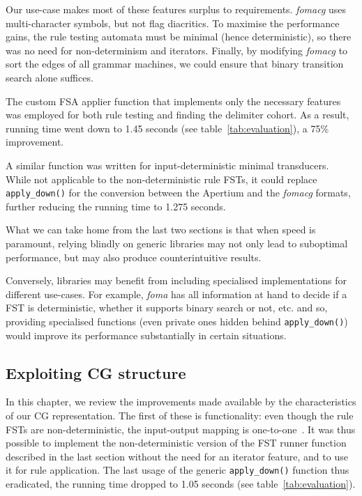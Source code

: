 \documentclass[11pt]{article}
\begin{document}
Our use-case makes most of these features surplus to requirements. \emph{fomacg} uses
multi-character symbols, but not flag diacritics. To maximise the performance
gains, the rule testing automata must be minimal (hence deterministic), so
there was no need for non-determinism and iterators. Finally, by modifying
\emph{fomacg} to sort the edges of all grammar machines, we could ensure that
binary transition search alone suffices.

The custom FSA applier function that implements only the necessary features
was employed for both rule testing and finding the delimiter cohort. As a result,
running time went down to 1.45 seconds (see table~\ref{tab:evaluation}), a 75\%
improvement.

A similar function was written for input-deterministic minimal transducers.
While not applicable to the non-deterministic rule FSTs, it could
replace \texttt{apply\_down()} for the conversion between the Apertium and  %
the \emph{fomacg} formats, further reducing the running time to 1.275 seconds.


What we can take home from the last two sections is that when speed is paramount,
relying blindly on generic libraries may not only lead to suboptimal performance,
but may also produce counterintuitive results.

Conversely, libraries may benefit from including specialised implementations
for different use-cases. For example, \emph{foma} has all information at hand
to decide if a FST is deterministic, whether it supports binary search or not,
etc. and so, providing specialised functions (even private ones hidden behind
\texttt{apply\_down()}) would improve its performance substantially in certain
situations.

\subsection{Exploiting CG structure}  %
\label{sec:speed_cg}

In this chapter, we review the improvements made available by the
characteristics of our CG representation. The first of these is functionality:
even though the rule FSTs are non-deterministic, the input-output mapping is
one-to-one~\cite{Hulden:2011}. It was thus possible to implement the
non-deterministic version of the FST runner function described in the last
section without the need for an iterator feature, and to use it for rule
application. The last usage of the generic \texttt{apply\_down()} function  %
thus eradicated, the running time dropped to 1.05 seconds (see
table~\ref{tab:evaluation}).
\end{document}
